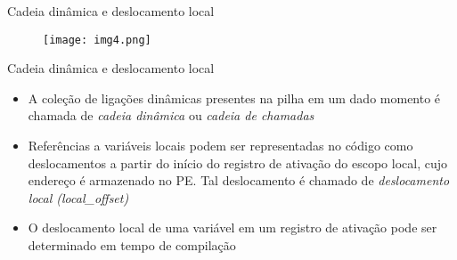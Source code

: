 \documentclass[10pt]{beamer}
\begin{document}
\begin{frame}{Cadeia dinâmica e deslocamento local}
  
  \begin{figure}
      \texttt{[image: img4.png]}
    \end{figure}
  
\end{frame}

\begin{frame}{Cadeia dinâmica e deslocamento local}
    \begin{itemize}
    	\item A coleção de ligações dinâmicas presentes na pilha em um dado momento é chamada de \textit{cadeia dinâmica} ou \textit{cadeia de chamadas}
    	\item Referências a variáveis locais podem ser representadas no código como deslocamentos a partir do início do registro de ativação do escopo local, cujo endereço é armazenado no PE. Tal deslocamento é chamado de \textit{deslocamento local (local\_offset)}
    	\item O deslocamento local de uma variável em um registro de ativação pode ser determinado em tempo de compilação
    \end{itemize}

\end{frame}
\end{document}
